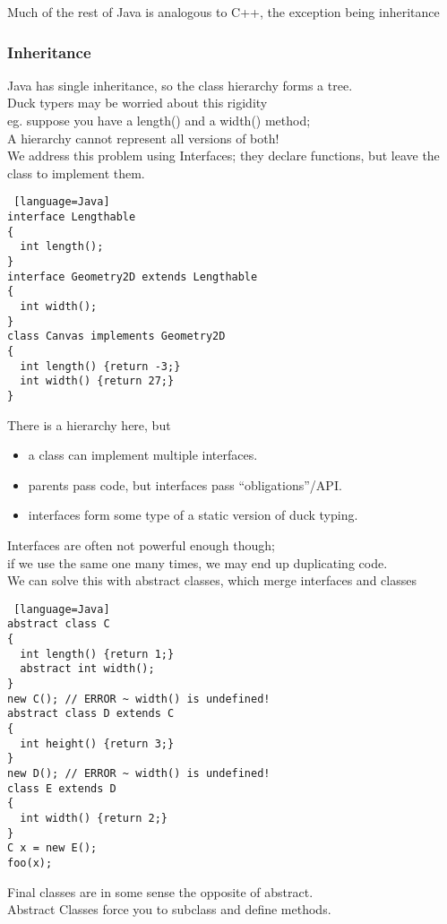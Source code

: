 \documentclass[../../lecture_notes.tex]{subfiles}
\begin{document}
\noindent Much of the rest of Java is analogous to C++, the exception being inheritance

\subsubsection*{Inheritance}
\noindent Java has single inheritance, so the class hierarchy forms a tree.\\
Duck typers may be worried about this rigidity\\
	\indent eg. suppose you have a length() and a width() method;\\
	\indent \indent A hierarchy cannot represent all versions of both!\\
We address this problem using Interfaces; they declare functions, but leave the class to implement them.\\
\begin{lstlisting} [language=Java]
interface Lengthable
{
  int length();
}
interface Geometry2D extends Lengthable 
{
  int width();
}
class Canvas implements Geometry2D
{
  int length() {return -3;}
  int width() {return 27;}
}
\end{lstlisting}
\noindent There is a hierarchy here, but
\begin{itemize} [itemsep=0mm]
	\item a class can implement multiple interfaces.
	\item parents pass code, but interfaces pass “obligations”/API.
	\item interfaces form some type of a static version of duck typing.
\end{itemize}
\noindent Interfaces are often not powerful enough though;\\
\indent if we use the same one many times, we may end up duplicating code.\\
We can solve this with abstract classes, which merge interfaces and classes
\begin{lstlisting} [language=Java]
abstract class C
{
  int length() {return 1;}
  abstract int width();
} 
new C(); // ERROR ~ width() is undefined!
abstract class D extends C
{
  int height() {return 3;}
} 
new D(); // ERROR ~ width() is undefined!
class E extends D
{
  int width() {return 2;}
}
C x = new E();
foo(x);
\end{lstlisting}
\noindent Final classes are in some sense the opposite of abstract.\\
\indent Abstract Classes force you to subclass and define methods.\\
\end{document}
